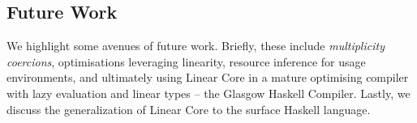 \documentclass[acmsmall,review,screen]{acmart}
\newcommand{\parawith}[1]{\paragraph{\emph{#1}}}
\begin{document}
% 

% 

\subsection{Future Work\label{sec:future-work}}

We highlight some avenues of future work. Briefly,
these include \emph{multiplicity coercions}, optimisations leveraging
linearity, resource inference for usage environments, and ultimately using
Linear Core in a mature optimising compiler with lazy evaluation and linear
types -- the Glasgow Haskell Compiler. Lastly, we discuss the
generalization of Linear Core to the surface Haskell language.
\end{document}

